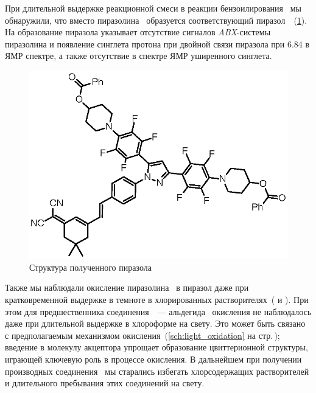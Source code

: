 При длительной выдержке реакционной смеси в реакции бензоилирования~ мы обнаружили, что вместо пиразолина~ образуется соответствующий пиразол~~(\ref{fig:pyrazole1}).
На образование пиразола указывает отсутствие  сигналов \emph{ABX}-системы пиразолина и появление синглета протона при двойной связи пиразола при \SI{6.84}{\ppm} в  ЯМР спектре, а также отсутствие в спектре ЯМР  уширенного синглета.

\begin{figure}[h!]
    \centering
    \includegraphics{sections/results/img/pyrazole1.eps}
    \caption{Структура полученного пиразола~}
    \label{fig:pyrazole1}
\end{figure}

Также мы наблюдали окисление пиразолина~ в пиразол даже при кратковременной выдержке в темноте в хлорированных растворителях~( и ).
При этом для предшественника соединения~~--- альдегида~ окисления не наблюдалось даже при длительной выдержке в хлороформе на свету.
Это может быть связано с предполагаемым механизмом окисления~(\ref{sch:light_oxidation} на стр.\,\pageref{sch:light_oxidation}); введение в молекулу акцептора упрощает образование цвиттерионной структуры, играющей ключевую роль в процессе окисления.
В дальнейшем при получении производных соединения~ мы старались избегать хлорсодержащих растворителей и длительного пребывания этих соединений на свету.

